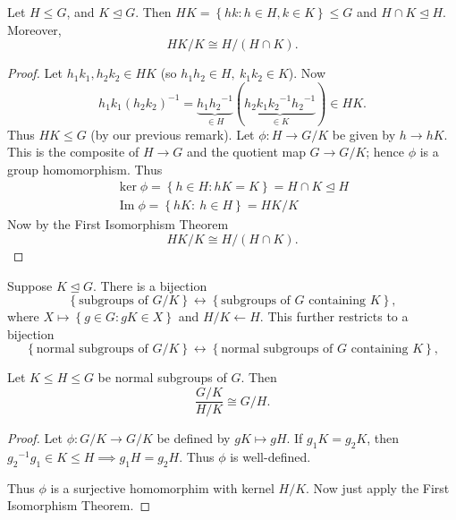 \documentclass[a4paper]{scrartcl}
\begin{document}
\begin{theorem}
      Let $H \leq G$, and $K \unlhd G$. Then $HK = \left\{hk: h \in H, k \in K\right\} \leq G$ and $H \cap K \unlhd H$. Moreover, \[
      HK/K \cong H/(H \cap K)
      .\] 
\end{theorem}
\begin{proof}
      Let $h_1 k_1 , h_2 k_2 \in HK$ (so $h_1 h_2 \in H, \ k_1 k_2 \in K$). Now \[
      h_1 k_1 {(h_2 k_2 )}^{-1}=\underbrace{h_1 {h_2 }^{-1}}_{\in H} (\underbrace{h_2 k_1 {k_2 }^{-1} {h_2 }^{-1}}_{\in K} )\in HK 
      .\] 
     Thus $HK \leq G$ (by our previous remark). Let $\phi: H \rightarrow G/K$ be given by $h \rightarrow hK$. This is the composite of $H \rightarrow G$ and the quotient map $G \rightarrow G/K$; hence $\phi$ is a group homomorphism. Thus
     \begin{align*}
          \operatorname{ker} \phi = \left\{h \in H: hK=K\right\}=H \cap K \unlhd H \\
          \operatorname{Im} \phi = \left\{hK: \ h \in H\right\}=HK/K
     \end{align*}
     Now by the First Isomorphism Theorem \[
     HK/K \cong H/(H \cap K)
     .\] 
\end{proof}
\begin{remark}[1.2]
      Suppose $K \unlhd G$. There is a bijection \[
      \left\{\text{subgroups of }G/K\right\} \leftrightarrow \left\{\text{subgroups of }G \text{ containing }K\right\}
      ,\] 
     where $X \mapsto \left\{g \in G: gK \in X\right\}$ and $H/K \leftarrow H$. This further restricts to a bijection 
     \[
      \left\{\text{normal subgroups of }G/K\right\} \leftrightarrow \left\{\text{normal subgroups of }G \text{ containing }K\right\}
      ,\] 
\end{remark}
\begin{theorem}
      Let $K \leq H \leq G$ be normal subgroups of $G$. Then \[
      \frac{G/K}{H/K} \cong G/H
      .\] 
\end{theorem}
\begin{proof}
      Let $\phi: G/K \rightarrow G/K$ be defined by $gK \mapsto gH$. If $g_1 K= g_2 K$, then ${g_2 }^{-1}g_1 \in K \leq H \implies  g_1 H= g_2 H$. Thus $\phi$ is well-defined.
      
      Thus $\phi$ is a surjective homomorphim with kernel $H/K$. Now just apply the First Isomorphism Theorem.
\end{proof}
\end{document}
